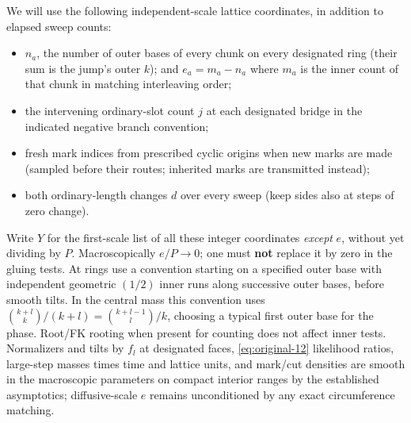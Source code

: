 \begin{definition}\label{kern:coordinates}

We will use the following independent-scale lattice coordinates, in addition to elapsed sweep counts:
\begin{itemize}
\item \(n_a\), the number of outer bases of every chunk on every designated ring (their sum is the jump's outer \(k\)); and \(e_a=m_a-n_a\) where \(m_a\) is the inner count of that chunk in matching interleaving order;
\item the intervening ordinary-slot count \(j\) at each designated bridge in the indicated negative branch convention;
\item fresh mark indices from prescribed cyclic origins when new marks are made (sampled before their routes; inherited marks are transmitted instead);
\item both ordinary-length changes \(d\) over every sweep (keep sides also at steps of zero change).
\end{itemize}

Write \(Y\) for the first-scale list of all these integer coordinates \emph{except} \(e\), without yet
dividing by \(P\). Macroscopically \(e/P\to0\); one must \textbf{not} replace it by zero in the gluing
tests. At rings use a convention starting on a specified outer base with independent geometric \((1/2)\)
inner runs along successive outer bases, before smooth tilts. In the central mass this convention uses
\(\binom{k+l}{k}/(k+l)=\binom{k+l-1}{l}/k\), choosing a typical first outer base for the phase. Root/FK
rooting when present for counting does not affect inner tests. Normalizers and tilts by \(f_l\) at
designated faces, \eqref{eq:original-12} likelihood ratios, large-step masses times time and lattice units,
and mark/cut densities are smooth in the macroscopic parameters on compact interior ranges by the
established asymptotics; diffusive-scale \(e\) remains unconditioned by any exact circumference matching.

\end{definition}

